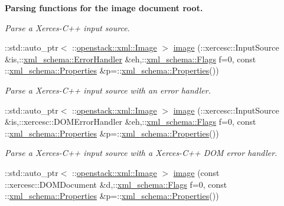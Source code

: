 \begin{Indent}{\bf Parsing functions for the image document root.}
\begin{DoxyCompactItemize}
\begin{DoxyCompactList}\small\item\em Parse a Xerces-\/C++ input source. \item\end{DoxyCompactList}\item 
::std::auto\_\-ptr$<$ ::\hyperlink{classopenstack_1_1xml_1_1Image}{openstack::xml::Image} $>$ \hyperlink{namespaceopenstack_1_1xml_aa689c9b7eb27c1e1924e17373c8af491}{image} (::xercesc::InputSource \&is,::\hyperlink{namespacexml__schema_ab1c9361bfd3b404eaabf0c31eded79dc}{xml\_\-schema::ErrorHandler} \&eh,::\hyperlink{namespacexml__schema_affb4c227cbd9aa7453dd1dc5a1401943}{xml\_\-schema::Flags} f=0, const ::\hyperlink{namespacexml__schema_ad27ce19a7ee1d3b1064092648898f64c}{xml\_\-schema::Properties} \&p=::\hyperlink{namespacexml__schema_ad27ce19a7ee1d3b1064092648898f64c}{xml\_\-schema::Properties}())
\begin{DoxyCompactList}\small\item\em Parse a Xerces-\/C++ input source with an error handler. \item\end{DoxyCompactList}\item 
::std::auto\_\-ptr$<$ ::\hyperlink{classopenstack_1_1xml_1_1Image}{openstack::xml::Image} $>$ \hyperlink{namespaceopenstack_1_1xml_ade8cc3053989daa9bd4bc3b0c3cd2bac}{image} (::xercesc::InputSource \&is,::xercesc::DOMErrorHandler \&eh,::\hyperlink{namespacexml__schema_affb4c227cbd9aa7453dd1dc5a1401943}{xml\_\-schema::Flags} f=0, const ::\hyperlink{namespacexml__schema_ad27ce19a7ee1d3b1064092648898f64c}{xml\_\-schema::Properties} \&p=::\hyperlink{namespacexml__schema_ad27ce19a7ee1d3b1064092648898f64c}{xml\_\-schema::Properties}())
\begin{DoxyCompactList}\small\item\em Parse a Xerces-\/C++ input source with a Xerces-\/C++ DOM error handler. \item\end{DoxyCompactList}\item 
::std::auto\_\-ptr$<$ ::\hyperlink{classopenstack_1_1xml_1_1Image}{openstack::xml::Image} $>$ \hyperlink{namespaceopenstack_1_1xml_a5e44beb54cc062fe6e52b2db84f4dc0e}{image} (const ::xercesc::DOMDocument \&d,::\hyperlink{namespacexml__schema_affb4c227cbd9aa7453dd1dc5a1401943}{xml\_\-schema::Flags} f=0, const ::\hyperlink{namespacexml__schema_ad27ce19a7ee1d3b1064092648898f64c}{xml\_\-schema::Properties} \&p=::\hyperlink{namespacexml__schema_ad27ce19a7ee1d3b1064092648898f64c}{xml\_\-schema::Properties}())

\end{DoxyCompactItemize}
\end{Indent}
